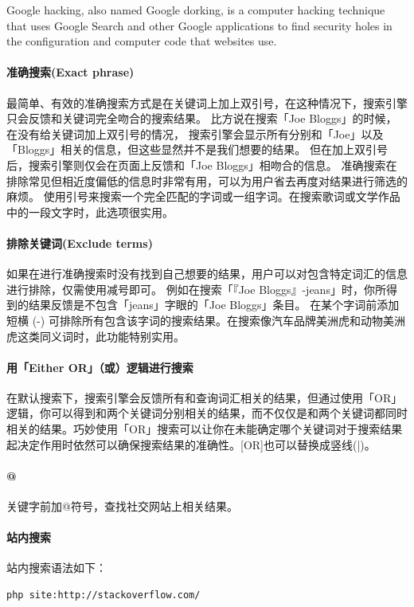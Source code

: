\documentclass{book}
\begin{document}
Google hacking, also named Google dorking, 
is a computer hacking technique that uses Google Search and other Google applications to find security holes in the configuration and computer code that websites use.

\paragraph{准确搜索(Exact phrase)}
最简单、有效的准确搜索方式是在关键词上加上双引号，在这种情况下，搜索引擎只会反馈和关键词完全吻合的搜索结果。
比方说在搜索「Joe Bloggs」的时候，在没有给关键词加上双引号的情况，
搜索引擎会显示所有分别和「Joe」以及「Bloggs」相关的信息，但这些显然并不是我们想要的结果。
但在加上双引号后，搜索引擎则仅会在页面上反馈和「Joe Bloggs」相吻合的信息。
准确搜索在排除常见但相近度偏低的信息时非常有用，可以为用户省去再度对结果进行筛选的麻烦。
使用引号来搜索一个完全匹配的字词或一组字词。在搜索歌词或文学作品中的一段文字时，此选项很实用。

\paragraph{排除关键词(Exclude terms)}
如果在进行准确搜索时没有找到自己想要的结果，用户可以对包含特定词汇的信息进行排除，仅需使用减号即可。
例如在搜索「『Joe Bloggs』-jeans」时，你所得到的结果反馈是不包含「jeans」字眼的「Joe Bloggs」条目。
在某个字词前添加短横 (-) 可排除所有包含该字词的搜索结果。在搜索像汽车品牌美洲虎和动物美洲虎这类同义词时，此功能特别实用。

\paragraph{用「Either OR」（或）逻辑进行搜索}
在默认搜索下，搜索引擎会反馈所有和查询词汇相关的结果，但通过使用「OR」逻辑，你可以得到和两个关键词分别相关的结果，而不仅仅是和两个关键词都同时相关的结果。巧妙使用「OR」搜索可以让你在未能确定哪个关键词对于搜索结果起决定作用时依然可以确保搜索结果的准确性。[OR]也可以替换成竖线(|)。

\paragraph{@}关键字前加@符号，查找社交网站上相关结果。

\paragraph{站内搜索}站内搜索语法如下：

\begin{lstlisting}
php site:http://stackoverflow.com/
\end{lstlisting}
\end{document}
